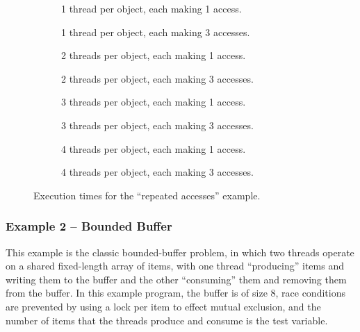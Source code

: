 \documentclass[12pt,a4paper,twoside,openright]{report}
\newenvironment{figtile} %
{\begin{subfigure}{0.48\textwidth}
		\def\svgwidth{\textwidth}
		\captionsetup{font=footnotesize}
	}
	{\end{subfigure}}
\begin{document}
\begin{figure}
	\centering
	\footnotesize
	\begin{figtile}
		
		\caption{1 thread per object,
			each making 1 access.}
	\end{figtile}%
	\quad
	\begin{figtile}
		
		\caption{1 thread per object,
			each making 3 accesses.}
	\end{figtile}
	\begin{figtile}
		
		\caption{2 threads per object,
			each making 1 access.}
	\end{figtile}%
	\quad
	\begin{figtile}
		
		\caption{2 threads per object,
			each making 3 accesses.}
	\end{figtile}
	\begin{figtile}
		
		\caption{3 threads per object,
			each making 1 access.}
	\end{figtile}%
	\quad
	\begin{figtile}
		
		\caption{3 threads per object,
			each making 3 accesses.}
	\end{figtile}
	\begin{figtile}
		
		\caption{4 threads per object,
			each making 1 access.}
	\end{figtile}%
	\quad
	\begin{figtile}
		
		\caption{4 threads per object,
			each making 3 accesses.}
		\label{fig:repeated-access-time-h}
	\end{figtile}
	\caption{Execution times for the ``repeated accesses'' example.}
	\label{fig:repeated-access-time}
\end{figure}

\subsubsection{Example 2 -- Bounded Buffer}
This example is the classic bounded-buffer problem,
in which two threads operate on a shared fixed-length
array of items, with one thread ``producing'' items
and writing them to the buffer and the other
``consuming'' them and removing them from the buffer.
In this example program, the buffer is of size 8,
race conditions are prevented by using a lock per
item to effect mutual exclusion, and the number
of items that the threads produce and consume is
the test variable.
\end{document}
